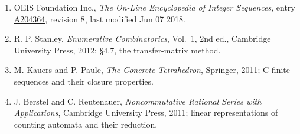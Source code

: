 \documentclass[11pt]{article}
\theoremstyle{definition}
\begin{document}
\begin{enumerate}

\item OEIS Foundation Inc., \emph{The On-Line Encyclopedia of Integer Sequences}, entry \href{https://oeis.org/A204364}{A204364}, revision 8, last modified Jun 07 2018.

\item R. P. Stanley, \emph{Enumerative Combinatorics}, Vol.~1, 2nd ed., Cambridge University Press, 2012; \S4.7, the transfer-matrix method.

\item M. Kauers and P. Paule, \emph{The Concrete Tetrahedron}, Springer, 2011; C-finite sequences and their closure properties.

\item J. Berstel and C. Reutenauer, \emph{Noncommutative Rational Series with Applications}, Cambridge University Press, 2011; linear representations of counting automata and their reduction.

\end{enumerate}
\end{document}
